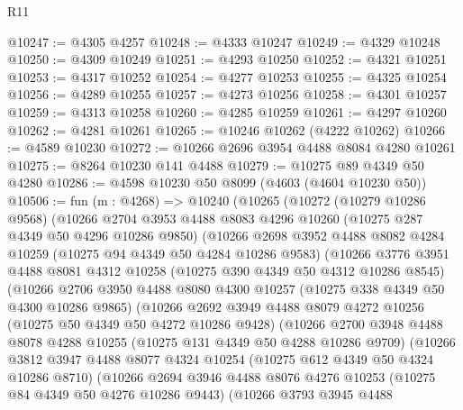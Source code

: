 \begin{lexlean}{R11}
\begin{coremodule}
@10247 := @4305 @4257
@10248 := @4333 @10247
@10249 := @4329 @10248
@10250 := @4309 @10249
@10251 := @4293 @10250
@10252 := @4321 @10251
@10253 := @4317 @10252
@10254 := @4277 @10253
@10255 := @4325 @10254
@10256 := @4289 @10255
@10257 := @4273 @10256
@10258 := @4301 @10257
@10259 := @4313 @10258
@10260 := @4285 @10259
@10261 := @4297 @10260
@10262 := @4281 @10261
@10265 := @10246 @10262 (@4222 @10262)
@10266 := @4589 @10230
@10272 := @10266 @2696 @3954 @4488 @8084 @4280 @10261
@10275 := @8264 @10230 @141 @4488
@10279 := @10275 @89 @4349 @50 @4280
@10286 := @4598 @10230 @50 @8099 (@4603 (@4604 @10230 @50))
@10506 := fun (m : @4268) =>
  @10240
    (@10265
      (@10272
        (@10279 @10286 @9568)
        (@10266
          @2704
          @3953
          @4488
          @8083
          @4296
          @10260
          (@10275 @287 @4349 @50 @4296 @10286 @9850)
          (@10266
            @2698
            @3952
            @4488
            @8082
            @4284
            @10259
            (@10275 @94 @4349 @50 @4284 @10286 @9583)
            (@10266
              @3776
              @3951
              @4488
              @8081
              @4312
              @10258
              (@10275 @390 @4349 @50 @4312 @10286 @8545)
              (@10266
                @2706
                @3950
                @4488
                @8080
                @4300
                @10257
                (@10275 @338 @4349 @50 @4300 @10286 @9865)
                (@10266
                  @2692
                  @3949
                  @4488
                  @8079
                  @4272
                  @10256
                  (@10275 @50 @4349 @50 @4272 @10286 @9428)
                  (@10266
                    @2700
                    @3948
                    @4488
                    @8078
                    @4288
                    @10255
                    (@10275 @131 @4349 @50 @4288 @10286 @9709)
                    (@10266
                      @3812
                      @3947
                      @4488
                      @8077
                      @4324
                      @10254
                      (@10275 @612 @4349 @50 @4324 @10286 @8710)
                      (@10266
                        @2694
                        @3946
                        @4488
                        @8076
                        @4276
                        @10253
                        (@10275 @84 @4349 @50 @4276 @10286 @9443)
                        (@10266
                          @3793
                          @3945
                          @4488

\end{coremodule}
\end{lexlean}
